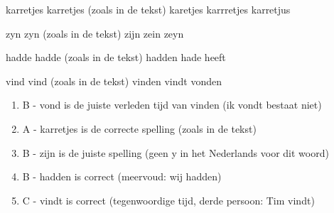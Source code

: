 \begin{opgave}
\begin{vragen}
%
{karretjes}%
{karretjes (zoals in de tekst)}%
{karetjes}%
{karrretjes}%
{karretjus}

%
{zyn}%
{zyn (zoals in de tekst)}%
{zijn}%
{zein}%
{zeyn}

%
{hadde}%
{hadde (zoals in de tekst)}%
{hadden}%
{hade}%
{heeft}

%
{vind}%
{vind (zoals in de tekst)}%
{vinden}%
{vindt}%
{vonden}
\end{vragen}

\end{opgave}

\begin{oplossing}
\begin{enumerate}
\item B - vond is de juiste verleden tijd van vinden (ik vondt bestaat niet)
\item A - karretjes is de correcte spelling (zoals in de tekst)
\item B - zijn is de juiste spelling (geen y in het Nederlands voor dit woord)
\item B - hadden is correct (meervoud: wij hadden)
\item C - vindt is correct (tegenwoordige tijd, derde persoon: Tim vindt)
\end{enumerate}
\end{oplossing}
